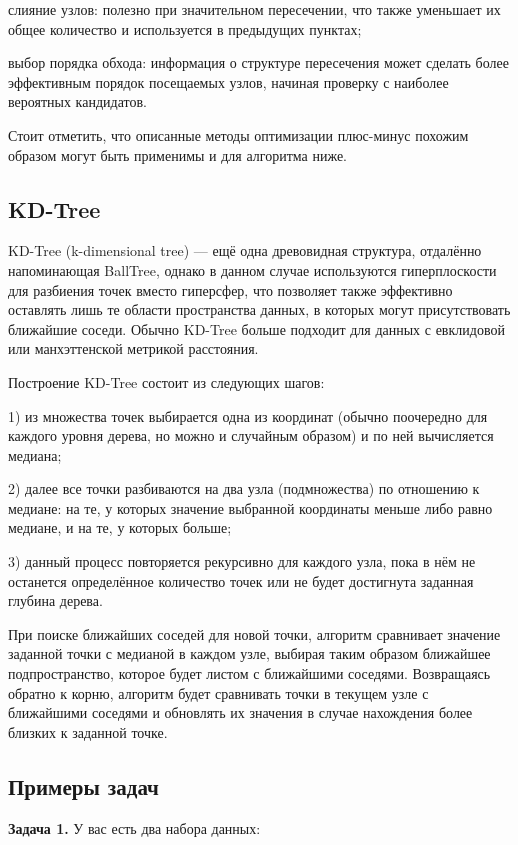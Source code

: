 слияние узлов: полезно при значительном пересечении, что также уменьшает их общее количество и используется в предыдущих пунктах;

выбор порядка обхода: информация о структуре пересечения может сделать более эффективным порядок посещаемых узлов, начиная проверку с наиболее вероятных кандидатов.

Стоит отметить, что описанные методы оптимизации плюс-минус похожим образом могут быть применимы и для алгоритма ниже.

\subsection{KD-Tree}
KD-Tree (k-dimensional tree) — ещё одна древовидная структура, отдалённо напоминающая BallTree, однако в данном случае используются гиперплоскости для разбиения точек вместо гиперсфер, что позволяет также эффективно оставлять лишь те области пространства данных, в которых могут присутствовать ближайшие соседи. Обычно KD-Tree больше подходит для данных с евклидовой или манхэттенской метрикой расстояния.

Построение KD-Tree состоит из следующих шагов:

1) из множества точек выбирается одна из координат (обычно поочередно для каждого уровня дерева, но можно и случайным образом) и по ней вычисляется медиана;

2) далее все точки разбиваются на два узла (подмножества) по отношению к медиане: на те, у которых значение выбранной координаты меньше либо равно медиане, и на те, у которых больше;

3) данный процесс повторяется рекурсивно для каждого узла, пока в нём не останется определённое количество точек или не будет достигнута заданная глубина дерева.

При поиске ближайших соседей для новой точки, алгоритм сравнивает значение заданной точки с медианой в каждом узле, выбирая таким образом ближайшее подпространство, которое будет листом с ближайшими соседями. Возвращаясь обратно к корню, алгоритм будет сравнивать точки в текущем узле с ближайшими соседями и обновлять их значения в случае нахождения более близких к заданной точке.

\subsection{Примеры задач}

\textbf{Задача 1.}
У вас есть два набора данных:

